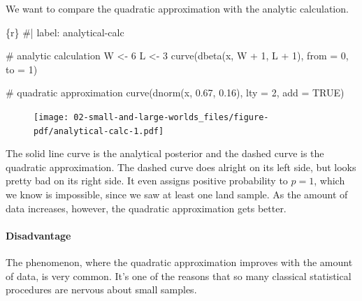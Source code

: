 \documentclass[
  letterpaper,
  DIV=11,
  numbers=noendperiod]{scrreprt}
\let\oldparagraph\paragraph
\renewcommand{\paragraph}[1]{\oldparagraph{#1}\mbox{}}
\newenvironment{Shaded}{\begin{snugshade}}{\end{snugshade}}
\newcommand{\AttributeTok}[1]{\textcolor[rgb]{0.40,0.45,0.13}{#1}}
\newcommand{\CommentTok}[1]{\textcolor[rgb]{0.37,0.37,0.37}{#1}}
\newcommand{\ConstantTok}[1]{\textcolor[rgb]{0.56,0.35,0.01}{#1}}
\newcommand{\DecValTok}[1]{\textcolor[rgb]{0.68,0.00,0.00}{#1}}
\newcommand{\FloatTok}[1]{\textcolor[rgb]{0.68,0.00,0.00}{#1}}
\newcommand{\FunctionTok}[1]{\textcolor[rgb]{0.28,0.35,0.67}{#1}}
\newcommand{\InformationTok}[1]{\textcolor[rgb]{0.37,0.37,0.37}{#1}}
\newcommand{\NormalTok}[1]{\textcolor[rgb]{0.00,0.23,0.31}{#1}}
\newcommand{\OtherTok}[1]{\textcolor[rgb]{0.00,0.23,0.31}{#1}}
\newcommand{\SpecialCharTok}[1]{\textcolor[rgb]{0.37,0.37,0.37}{#1}}
\begin{document}
We want to compare the quadratic approximation with the analytic
calculation.

\begin{Shaded}
\begin{Highlighting}[]
\InformationTok{\textasciigrave{}\textasciigrave{}\textasciigrave{}\{r\}}
\CommentTok{\#| label: analytical{-}calc}

\CommentTok{\# analytic calculation}
\NormalTok{W }\OtherTok{\textless{}{-}} \DecValTok{6}
\NormalTok{L }\OtherTok{\textless{}{-}} \DecValTok{3}
\FunctionTok{curve}\NormalTok{(}\FunctionTok{dbeta}\NormalTok{(x, W }\SpecialCharTok{+} \DecValTok{1}\NormalTok{, L }\SpecialCharTok{+} \DecValTok{1}\NormalTok{), }\AttributeTok{from =} \DecValTok{0}\NormalTok{, }\AttributeTok{to =} \DecValTok{1}\NormalTok{)}

\CommentTok{\# quadratic approximation}
\FunctionTok{curve}\NormalTok{(}\FunctionTok{dnorm}\NormalTok{(x, }\FloatTok{0.67}\NormalTok{, }\FloatTok{0.16}\NormalTok{), }\AttributeTok{lty =} \DecValTok{2}\NormalTok{, }\AttributeTok{add =} \ConstantTok{TRUE}\NormalTok{)}
\InformationTok{\textasciigrave{}\textasciigrave{}\textasciigrave{}}
\end{Highlighting}
\end{Shaded}

\begin{figure}[H]

{\centering \texttt{[image: 02-small-and-large-worlds\_files/figure-pdf/analytical-calc-1.pdf]}

}

\end{figure}

The solid line curve is the analytical posterior and the dashed curve is
the quadratic approximation. The dashed curve does alright on its left
side, but looks pretty bad on its right side. It even assigns positive
probability to \(p = 1\), which we know is impossible, since we saw at
least one land sample. As the amount of data increases, however, the
quadratic approximation gets better.

\hypertarget{disadvantage-1}{%
\paragraph{Disadvantage}\label{disadvantage-1}}

The phenomenon, where the quadratic approximation improves with the
amount of data, is very common. It's one of the reasons that so many
classical statistical procedures are nervous about small samples.
\end{document}

